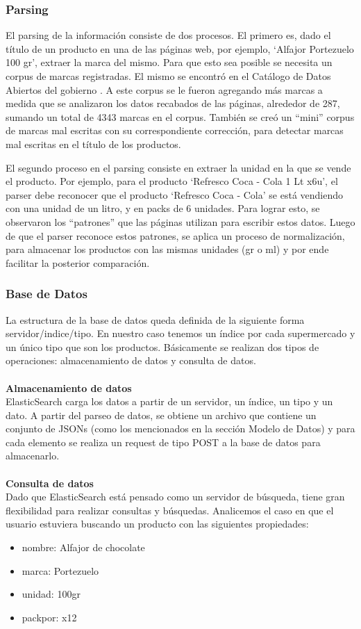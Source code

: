 \documentclass[12pt]{article} %
\begin{document}
\subsubsection{Parsing}

El parsing de la información consiste de dos procesos. El primero es, dado el título de un producto en una de las páginas web, por ejemplo, ‘Alfajor Portezuelo 100 gr’, extraer la marca del mismo. Para que esto sea posible se necesita un corpus de marcas registradas. El mismo se encontró en el Catálogo de Datos Abiertos del gobierno \cite{DatosAbiertos}. A este corpus se le fueron agregando más marcas a medida que se analizaron los datos recabados de las páginas, alrededor de 287, sumando un total de 4343 marcas en el corpus. También se creó un “mini” corpus de marcas mal escritas con su correspondiente corrección, para detectar marcas mal escritas en el título de los productos.

El segundo proceso en el parsing consiste en extraer la unidad en la que se vende el producto. Por ejemplo, para el producto ‘Refresco Coca - Cola 1 Lt x6u’, el parser debe reconocer que el producto ‘Refresco Coca - Cola’ se está vendiendo con una unidad de un litro, y en packs de 6 unidades. Para lograr esto, se observaron los “patrones” que las páginas utilizan para escribir estos datos. Luego de que el parser reconoce estos patrones, se aplica un proceso de normalización, para almacenar los productos con las mismas unidades (gr o ml) y por ende facilitar la posterior comparación.

\subsubsection{Base de Datos}
La estructura de la base de datos queda definida de la siguiente forma servidor/indice/tipo. En nuestro caso tenemos un índice por cada supermercado y un único tipo que son los productos. 
Básicamente se realizan dos tipos de operaciones: almacenamiento de datos y consulta de datos. 
\\
\\
\textbf{Almacenamiento de datos}
\\
ElasticSearch carga los datos a partir de un servidor, un índice, un tipo y un dato. 
A partir del parseo de datos, se obtiene un archivo que contiene un conjunto de JSONs (como los mencionados en la sección Modelo de Datos) y para cada elemento se realiza un request de tipo POST a la base de datos para almacenarlo.
\\
\\
\textbf{Consulta de datos}
\\
Dado que ElasticSearch está pensado como un servidor de búsqueda, tiene gran flexibilidad para realizar consultas y búsquedas. Analicemos el caso en que el usuario estuviera buscando un producto con las siguientes propiedades:
\begin{itemize}
	\item nombre: Alfajor de chocolate
	\item marca: Portezuelo
	\item unidad: 100gr
	\item packpor: x12
\end{itemize}
\end{document}
